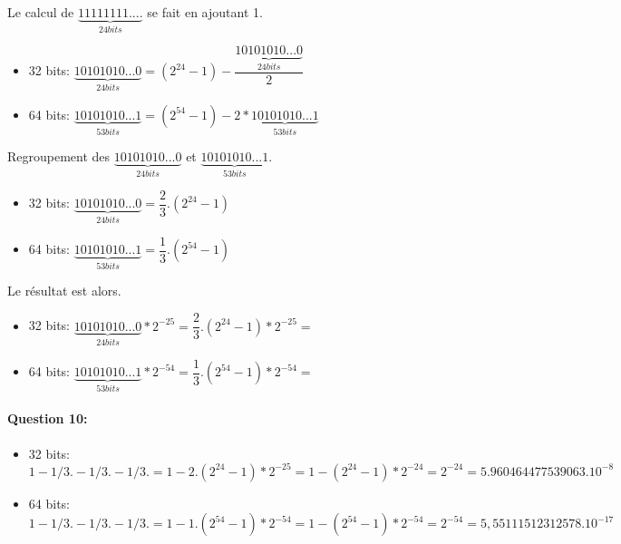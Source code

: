 Le calcul de $\underbrace{11111111....}_{24 bits}$ se fait en ajoutant 1.

\begin{itemize}
 \item 32 bits: $\underbrace{10101010...0}_{24 bits}=(2^{24}-1)-\dfrac{\underbrace{10101010...0}_{24 bits}}{2}$
 \item 64 bits: $\underbrace{10101010...1}_{53 bits}=(2^{54}-1)-2*\underbrace{10101010...1}_{53 bits}$
\end{itemize}

Regroupement des $\underbrace{10101010...0}_{24 bits}$ et $\underbrace{10101010...1}_{53 bits}$.

\begin{itemize}
 \item 32 bits: $\underbrace{10101010...0}_{24 bits}=\dfrac{2}{3}.(2^{24}-1)$
 \item 64 bits: $\underbrace{10101010...1}_{53 bits}=\dfrac{1}{3}.(2^{54}-1)$
\end{itemize}

Le résultat est alors.

\begin{itemize}
 \item 32 bits: $\underbrace{10101010...0}_{24 bits}*2^{-25}=\dfrac{2}{3}.(2^{24}-1)*2^{-25}=$
 \item 64 bits: $\underbrace{10101010...1}_{53 bits}*2^{-54}=\dfrac{1}{3}.(2^{54}-1)*2^{-54}=$
\end{itemize}

\paragraph{Question 10:}
\begin{itemize}
 \item 32 bits: $1-1/3.-1/3.-1/3.=1-2.(2^{24}-1)*2^{-25}=1-(2^{24}-1)*2^{-24}=2^{-24}=5.960464477539063.10^{-8}$
 \item 64 bits: $1-1/3.-1/3.-1/3.=1-1.(2^{54}-1)*2^{-54}=1-(2^{54}-1)*2^{-54}=2^{-54}=5,55111512312578.10^{-17}$
\end{itemize}



